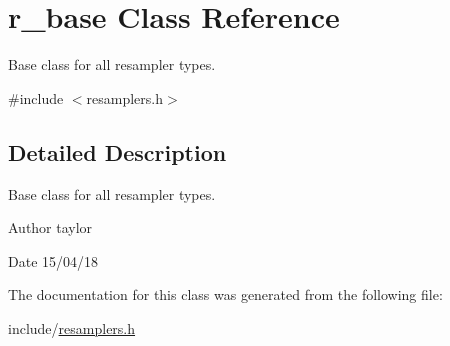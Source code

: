 \hypertarget{classr__base}{}\section{r\+\_\+base Class Reference}
\label{classr__base}


Base class for all resampler types.  




{\ttfamily \#include $<$resamplers.\+h$>$}



\subsection{Detailed Description}
Base class for all resampler types. 

\begin{DoxyAuthor}{Author}
taylor 
\end{DoxyAuthor}
\begin{DoxyDate}{Date}
15/04/18 
\end{DoxyDate}


The documentation for this class was generated from the following file\+:\begin{DoxyCompactItemize}
\item 
include/\hyperlink{resamplers_8h}{resamplers.\+h}\end{DoxyCompactItemize}
